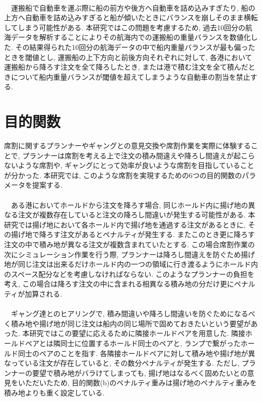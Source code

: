  \\
　運搬船で自動車を運ぶ際に船の前方や後方へ自動車を詰め込みすぎたり, 船の上方へ自動車を詰め込みすぎると船が傾いたときにバランスを崩しそのまま横転してしまう可能性がある\cite{balance}. 本研究ではこの問題を考慮するため, 過去10回分の航海データを解析することによりその航海内での運搬船の重量バランスを数値化した. その結果得られた10回分の航海データの中で船内重量バランスが最も偏ったときを閾値とし, 運搬船の上下方向と前後方向それぞれに対して, 各港において運搬船から降ろす注文を全て降ろしたとき, または港で積む注文を全て積んだときについて船内重量バランスが閾値を超えてしまうような自動車の割当を禁止する.

\section{目的関数}
席割に関するプランナーやギャングとの意見交換や席割作業を実際に体験することで, プランナーは席割を考える上で注文の積み間違えや降ろし間違えが起こらないような席割や, ギャングにとって効率が良いような席割を目指していることが分かった. 本研究では, このような席割を実現するための6つの目的関数のパラメータを提案する. \\

 \\
　ある港においてホールドから注文を降ろす場合, 同じホールド内に揚げ地の異なる注文が複数存在していると注文の降ろし間違いが発生する可能性がある. 本研究では揚げ地において各ホールド内で揚げ地を通過する注文があるときに, その揚げ地で降ろす注文があるとペナルティが発生する.  またこのとき更に降ろす注文の中で積み地が異なる注文が複数含まれていたとする. この場合席割作業の次にシミュレーション作業を行う際, プランナーは降ろし間違えを防ぐため揚げ地が同じ注文は出来るだけホールド内の一つの領域に行き渡るようにホールド内のスペース配分などを考慮しなければならない. このようなプランナーの負担を考え, この場合は降ろす注文の中に含まれる相異なる積み地の分だけ更にペナルティが加算される. \\


 \\
　ギャング達とのヒアリングで, 積み間違いや降ろし間違いを防ぐためになるべく積み地や揚げ地が同じ注文は船内の同じ場所で固めておきたいという要望があった. 本研究ではこの要望に応えるために隣接ホールドペアを用意した. 隣接ホールドペアとは隣同士に位置するホールド同士のペアと, ランプで繋がったホールド同士のペアのことを指す. 各隣接ホールドペアに対して積み地や揚げ地が異なっている注文が存在していると, その数分ペナルティが発生する. ただし, プランナーの要望で積み地がバラけてしまっても, 揚げ地はなるべく固めたいとの意見をいただいたため, 目的関数(b)のペナルティ重みは揚げ地のペナルティ重みを積み地よりも重く設定している. \\

